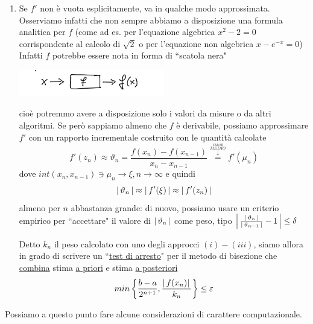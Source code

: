 \begin{enumerate}[label=\roman*)]
\item Se $f'$ non è vuota esplicitamente, va in qualche modo approssimata.\\Osserviamo infatti che non sempre abbiamo a disposizione una formula analitica per $f$ (come ad es. per l'equazione algebrica $x^2-2=0$ corrispondente al calcolo di $\sqrt{2}$ o per l'equazione non algebrica $x-e^{-x}=0$)\\
Infatti $f$ potrebbe essere nota in forma di ``scatola nera"\\
\begin{center}
\includegraphics[width=0.5\textwidth]{foto/scatolanera}    
\end{center}
cioè potremmo avere a disposizione solo i valori da misure o da altri algoritmi. Se però sappiamo almeno che $f$ è derivabile, possiamo approssimare $f'$ con un rapporto incrementale costruito con le quantità calcolate 
\[f'(z_n)\approx \vartheta_n=\frac{f(x_n)-f(x_{n-1})}{x_n-x_{n-1}}\overset{\overset{\overset{VALOR}{MEDIO}}{\downarrow}}{=} f'(\mu_n)\]
dove $int(x_n,x_{n-1})\ni \mu_n \rightarrow \xi, n\rightarrow\infty$ e quindi 
\[\abs{\,\vartheta_n\,}\approx \abs{\,f'(\xi)\,} \approx\abs{\,f'(z_n)\,}\] almeno per $n$ abbastanza grande: di nuovo, possiamo usare un criterio empirico per ``accettare" il valore di $\abs{\,\vartheta_n\,}$ come peso, tipo $\abs*{\,\frac{\abs{\,\vartheta_n\,}}{\abs{\,\vartheta_{n-1}\,}}-1\,}\le \delta$ 

Detto $k_n$ il peso calcolato con uno degli approcci $(i)-(iii)$, siamo allora in grado di scrivere un ``\uline{test di arresto}" per il metodo di bisezione che \uline{combina} stima \uline{a priori} e stima \uline{a posteriori}
\[min\left\{\frac{b-a}{2^{n+1}},\frac{\abs{\,f(x_n)}\,}{k_n}\right\}\le \varepsilon\]
\end{enumerate}
Possiamo a questo punto fare alcune considerazioni di carattere computazionale.


